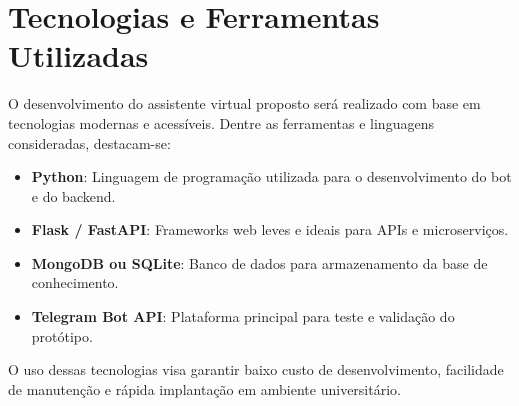 \section{Tecnologias e Ferramentas Utilizadas}

O desenvolvimento do assistente virtual proposto será realizado com base em tecnologias modernas e acessíveis. Dentre as ferramentas e linguagens consideradas, destacam-se:

\begin{itemize}
    \item \textbf{Python}: Linguagem de programação utilizada para o desenvolvimento do bot e do backend.
    \item \textbf{Flask / FastAPI}: Frameworks web leves e ideais para APIs e microserviços.
    \item \textbf{MongoDB ou SQLite}: Banco de dados para armazenamento da base de conhecimento.
    \item \textbf{Telegram Bot API}: Plataforma principal para teste e validação do protótipo.
\end{itemize}

O uso dessas tecnologias visa garantir baixo custo de desenvolvimento, facilidade de manutenção e rápida implantação em ambiente universitário.
